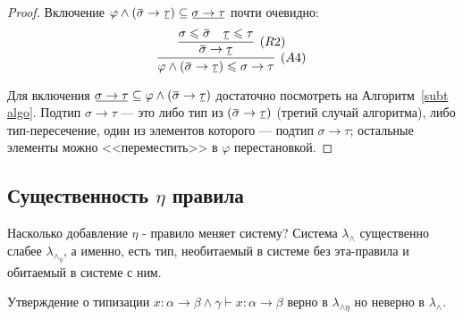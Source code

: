 \documentclass[../main.tex]{subfiles}
\begin{document}
\begin{proof}
    Включение $\varphi \wedge (\ob{\sigma} \to \ub{\tau}) \subseteq \ub{\sigma \to \tau}$ почти очевидно: 
    $$\infer[(A4)]{\varphi \wedge (\ob{\sigma} \to \ub{\tau}) \leqslant \sigma \to \tau}
                  {\infer[(R2)]{\ob{\sigma} \to \ub{\tau}}
                               {\sigma \leqslant \ob{\sigma} & \ub{\tau} \leqslant \tau}}$$
                               
    Для включения $\ub{\sigma \to \tau} \subseteq \varphi \wedge (\ob{\sigma} \to \ub{\tau})$ достаточно посмотреть на Алгоритм~\ref{subt algo}. Подтип $\sigma \to \tau$ --- это либо тип из $(\ob{\sigma} \to \ub{\tau})$ (третий случай алгоритма), либо тип-пересечение, один из элементов которого --- подтип $\sigma \to \tau$; остальные элементы можно <<переместить>> в $\varphi$ перестановкой.
\end{proof}


\subsection{Существенность $\eta$ правила}

Насколько добавление $\eta$ - правило меняет систему? 
Система $\lambda_\wedge$ существенно слабее $\lambda_\wedge_\eta$, а именно, есть тип, необитаемый в системе без эта-правила и обитаемый в системе с ним. 

\begin{lemma} \label{существенность: типизация}
Утверждение о типизации $x : \alpha \to \beta \wedge \gamma \vdash x : \alpha \to \beta$ верно в $\lambda_{\wedge \eta}$ но неверно в $\lambda_{\wedge}$.
\end{lemma}
\end{document}
